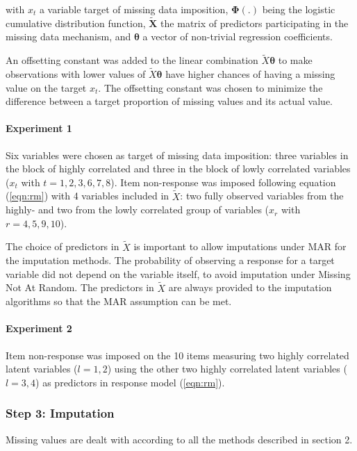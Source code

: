 	with $x_t$ a variable target of missing data imposition, $\bm{\Phi}(.)$ being the logistic cumulative
	distribution function, $\bm{\tilde{X}}$ the matrix of predictors participating in the missing data mechanism,
	and $\bm{\theta}$ a vector of non-trivial regression coefficients.
	
	An offsetting constant was added to the linear combination $\tilde{X}\bm{\theta}$ to make observations with 
	lower values of $\tilde{X}\bm{\theta}$ have higher chances of having a missing value on the target $x_t$. 
	The offsetting constant was chosen to minimize the difference between a target proportion of missing values 
	and its actual value.

	\paragraph{Experiment 1}
	Six variables were chosen as target of missing data imposition: three variables in the block of 
	highly correlated and three in the block of lowly correlated variables ($x_t$ with $t = 1,2,3,6,7,8$). 
	Item non-response was imposed following equation (\ref{eqn:rm}) with 4 variables included in $\tilde{X}$: two fully 
	observed variables from the highly- and two from the lowly correlated group of variables ($x_r$ with $r = 4,5,9,10$).

	The choice of predictors in $\tilde{X}$ is important to allow imputations under MAR for the imputation methods. 
	The probability of observing a response for a target variable did not depend on the variable itself, to avoid  
	imputation under Missing Not At Random.
	The predictors in $\tilde{X}$ are always provided to the imputation algorithms so that the MAR assumption can
	be met.

	\paragraph{Experiment 2}
	Item non-response was imposed on the 10 items measuring two highly correlated latent variables ($l = 1, 2$) 
	using the other two highly correlated latent variables ($l = 3, 4$) as predictors in response model (\ref{eqn:rm}). 

\subsubsection{Step 3: Imputation}
	
	Missing values are dealt with according to all the methods described in section 2.

